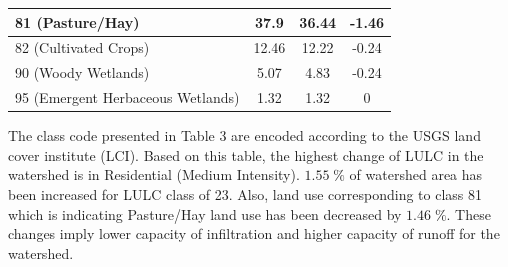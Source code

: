 \documentclass[letterpaper,12pt]{article}
\begin{document}
\begin{enumerate}
\begin{table}[]
\begin{tabular}{|l|c|c|c|}
		81 (Pasture/Hay)                  & 37.9                                   & 36.44                                  & -1.46                            \\ \hline
		82 (Cultivated Crops)             & 12.46                                  & 12.22                                  & -0.24                            \\ \hline
		90 (Woody Wetlands)               & 5.07                                   & 4.83                                   & -0.24                            \\ \hline
		95 (Emergent Herbaceous Wetlands) & 1.32                                   & 1.32                                   & 0                                \\ \hline
	\end{tabular}
\end{table}

The class code presented in Table 3 are encoded according to the USGS land cover institute (LCI). Based on this table, the highest change of LULC in the watershed is in Residential (Medium Intensity). $1.55\;\%$ of watershed area has been increased for LULC class of 23. Also, land use corresponding to class 81 which is indicating Pasture/Hay land use has been decreased by $1.46\;\%$. These changes imply lower capacity of infiltration and higher capacity of runoff for the watershed. 

\end{enumerate}



\newpage
\end{document}
